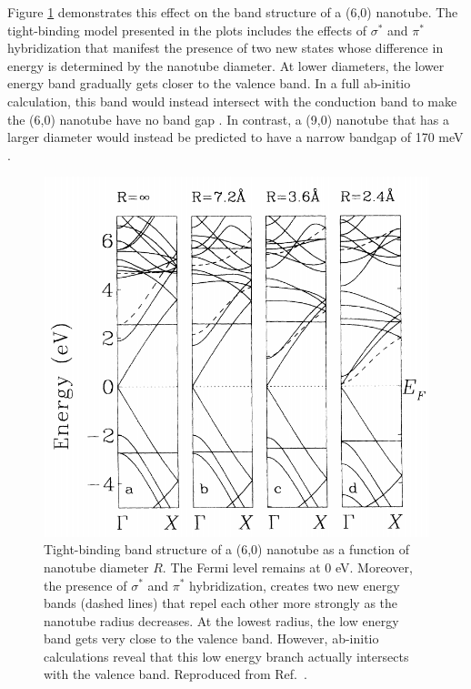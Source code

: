 Figure \ref{fig:cnt_curvature} demonstrates this effect on the band structure of a (6,0) nanotube. The tight-binding model presented in the plots includes the effects of $\sigma^*$ and $\pi^*$ hybridization that manifest the presence of two new states whose difference in energy is determined by the nanotube diameter. At lower diameters, the lower energy band gradually gets closer to the valence band. In a full ab-initio calculation, this band would instead intersect with the conduction band to make the (6,0) nanotube have no band gap \cite{blase1994hybridization}. In contrast, a (9,0) nanotube that has a larger diameter would instead be predicted to have a narrow bandgap of 170 meV \cite{blase1994hybridization}.

\begin{figure}[ht]
	\centering
	\includegraphics[scale=0.3]{images/chapter_optical_props/curvature_cnt_blase}
	\caption{Tight-binding band structure of a (6,0) nanotube as a function of nanotube diameter $R$. The Fermi level remains at 0 eV. Moreover, the presence of $\sigma^*$ and $\pi^*$ hybridization, creates two new energy bands (dashed lines) that repel each other more strongly as the nanotube radius decreases. At the lowest radius, the low energy band gets very close to the valence band. However, ab-initio calculations reveal that this low energy branch actually intersects with the valence band. Reproduced from Ref.\ \cite{blase1994hybridization}.}
	\label{fig:cnt_curvature}
\end{figure}

